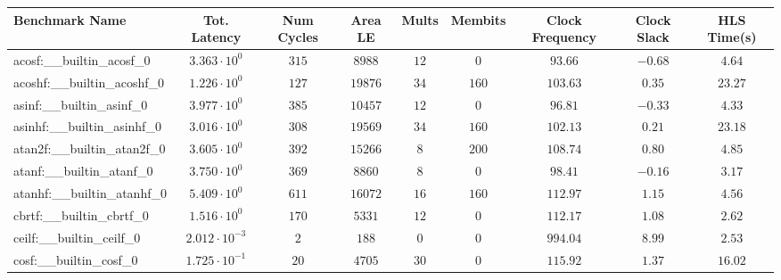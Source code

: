 \begin{tabular}{|l|c|c|c|c|c|c|c|c|}
\hline
Benchmark Name                            & Tot. Latency            & Num Cycles & Area LE    & Mults   & Membits  & Clock Frequency & Clock Slack & HLS Time(s) \\
\hline
acosf:\_\_builtin\_acosf\_0               & $ 3.363 \cdot 10^{0}  $ & $ 315    $ & $ 8988   $ & $ 12  $ & $ 0    $ & $ 93.66       $ & $ -0.68   $ & $ 4.64    $ \\
acoshf:\_\_builtin\_acoshf\_0             & $ 1.226 \cdot 10^{0}  $ & $ 127    $ & $ 19876  $ & $ 34  $ & $ 160  $ & $ 103.63      $ & $ 0.35    $ & $ 23.27   $ \\
asinf:\_\_builtin\_asinf\_0               & $ 3.977 \cdot 10^{0}  $ & $ 385    $ & $ 10457  $ & $ 12  $ & $ 0    $ & $ 96.81       $ & $ -0.33   $ & $ 4.33    $ \\
asinhf:\_\_builtin\_asinhf\_0             & $ 3.016 \cdot 10^{0}  $ & $ 308    $ & $ 19569  $ & $ 34  $ & $ 160  $ & $ 102.13      $ & $ 0.21    $ & $ 23.18   $ \\
atan2f:\_\_builtin\_atan2f\_0             & $ 3.605 \cdot 10^{0}  $ & $ 392    $ & $ 15266  $ & $ 8   $ & $ 200  $ & $ 108.74      $ & $ 0.80    $ & $ 4.85    $ \\
atanf:\_\_builtin\_atanf\_0               & $ 3.750 \cdot 10^{0}  $ & $ 369    $ & $ 8860   $ & $ 8   $ & $ 0    $ & $ 98.41       $ & $ -0.16   $ & $ 3.17    $ \\
atanhf:\_\_builtin\_atanhf\_0             & $ 5.409 \cdot 10^{0}  $ & $ 611    $ & $ 16072  $ & $ 16  $ & $ 160  $ & $ 112.97      $ & $ 1.15    $ & $ 4.56    $ \\
cbrtf:\_\_builtin\_cbrtf\_0               & $ 1.516 \cdot 10^{0}  $ & $ 170    $ & $ 5331   $ & $ 12  $ & $ 0    $ & $ 112.17      $ & $ 1.08    $ & $ 2.62    $ \\
ceilf:\_\_builtin\_ceilf\_0               & $ 2.012 \cdot 10^{-3} $ & $ 2      $ & $ 188    $ & $ 0   $ & $ 0    $ & $ 994.04      $ & $ 8.99    $ & $ 2.53    $ \\
cosf:\_\_builtin\_cosf\_0                 & $ 1.725 \cdot 10^{-1} $ & $ 20     $ & $ 4705   $ & $ 30  $ & $ 0    $ & $ 115.92      $ & $ 1.37    $ & $ 16.02   $ \\

\end{tabular}
